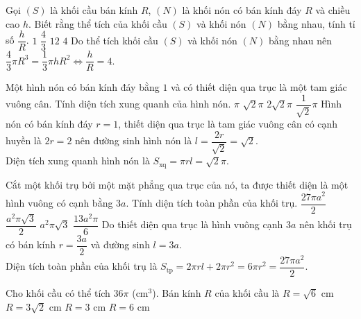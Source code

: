 \begin{ex}%
	Gọi $(S)$ là khối cầu bán kính $R$, $(N)$ là khối nón có bán kính đáy $R$ và chiều cao $h$. Biết rằng thể tích của khối cầu $(S)$ và khối nón $(N)$ bằng nhau, tính tỉ số $\dfrac{h}{R}$.
	\choice
	{$1$}
	{$\dfrac{4}{3}$}
	{$12$}
	{\True $4$}
	\loigiai
	{
		Do thể tích khối cầu $(S)$ và khối nón $(N)$ bằng nhau nên
		$\dfrac{4}{3}\pi R^3=\dfrac{1}{3}\pi h R^2\Leftrightarrow \dfrac{h}{R}=4.$
	}
\end{ex}

\begin{ex}%
	Một hình nón có bán kính đáy bằng $1$ và có thiết diện qua trục là một tam giác vuông cân. Tính diện tích xung quanh của hình nón.
	\choice
	{$\pi$}
	{\True $\sqrt{2}\pi$}
	{$2\sqrt{2}\pi$}
	{$\dfrac{1}{\sqrt{2}}\pi$}
	\loigiai
	{
		Hình nón có bán kính đáy $r=1$, thiết diện qua trục là tam giác vuông cân có cạnh huyền là $2r=2$ nên đường sinh hình nón là $l=\dfrac{2r}{\sqrt{2}}=\sqrt{2}$.\\
		Diện tích xung quanh hình nón là $S_\text{xq}=\pi rl= \sqrt{2}\pi.$
	}
\end{ex}

\begin{ex}%
	Cắt một khối trụ bởi một mặt phẳng qua trục của nó, ta được thiết diện là một hình vuông có cạnh bằng $3a$. Tính diện tích toàn phần của khối trụ.
	\choice
	{\True $\dfrac{27\pi a^2}{2}$}
	{$\dfrac{a^2\pi\sqrt{3}}{2}$}
	{$a^2\pi\sqrt{3}$}
	{$\dfrac{13a^2\pi}{6}$}
	\loigiai
	{
		Do thiết diện qua trục là hình vuông cạnh $3a$ nên khối trụ có bán kính $r=\dfrac{3a}{2}$ và đường sinh $l=3a$.\\
		Diện tích toàn phần của khối trụ là $S_\text{tp}=2\pi rl+2\pi r^2=6\pi r^2=\dfrac{27\pi a^2}{2}$.
	}
\end{ex}

\begin{ex}%
Cho khối cầu có thể tích $36\pi$ (cm$^3$). Bán kính $R$ của khối cầu là
\choice
{$R=\sqrt{6}$ cm}
{$R=3\sqrt{2}$ cm}
{\True $R=3$ cm}
{$R=6$ cm}

\end{ex}

